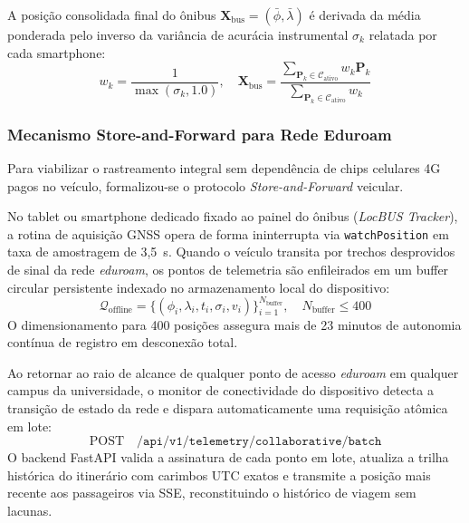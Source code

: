 \documentclass[lettersize,journal]{IEEEtran}
\begin{document}
A posição consolidada final do ônibus $\mathbf{X}_{\text{bus}} = (\bar{\phi}, \bar{\lambda})$ é derivada da média ponderada pelo inverso da variância de acurácia instrumental $\sigma_k$ relatada por cada smartphone:
\begin{equation}
w_k = \frac{1}{\max(\sigma_k, 1.0)}, \quad \mathbf{X}_{\text{bus}} = \frac{\sum_{\mathbf{P}_k \in \mathcal{C}_{\text{ativo}}} w_k \mathbf{P}_k}{\sum_{\mathbf{P}_k \in \mathcal{C}_{\text{ativo}}} w_k}
\end{equation}

\subsubsection{Mecanismo Store-and-Forward para Rede Eduroam}
Para viabilizar o rastreamento integral sem dependência de chips celulares 4G pagos no veículo, formalizou-se o protocolo \textit{Store-and-Forward} veicular.

No tablet ou smartphone dedicado fixado ao painel do ônibus (\textit{LocBUS Tracker}), a rotina de aquisição GNSS opera de forma ininterrupta via \texttt{watchPosition} em taxa de amostragem de 3,5~s. Quando o veículo transita por trechos desprovidos de sinal da rede \textit{eduroam}, os pontos de telemetria são enfileirados em um buffer circular persistente indexado no armazenamento local do dispositivo:
\begin{equation}
\mathcal{Q}_{\text{offline}} = \{ (\phi_i, \lambda_i, t_i, \sigma_i, v_i) \}_{i=1}^{N_{\text{buffer}}}, \quad N_{\text{buffer}} \le 400
\end{equation}
O dimensionamento para 400 posições assegura mais de 23 minutos de autonomia contínua de registro em desconexão total. 

Ao retornar ao raio de alcance de qualquer ponto de acesso \textit{eduroam} em qualquer campus da universidade, o monitor de conectividade do dispositivo detecta a transição de estado da rede e dispara automaticamente uma requisição atômica em lote:
\begin{equation}
\text{POST} \quad \texttt{/api/v1/telemetry/collaborative/batch}
\end{equation}
O backend FastAPI valida a assinatura de cada ponto em lote, atualiza a trilha histórica do itinerário com carimbos UTC exatos e transmite a posição mais recente aos passageiros via SSE, reconstituindo o histórico de viagem sem lacunas.

\end{document}
